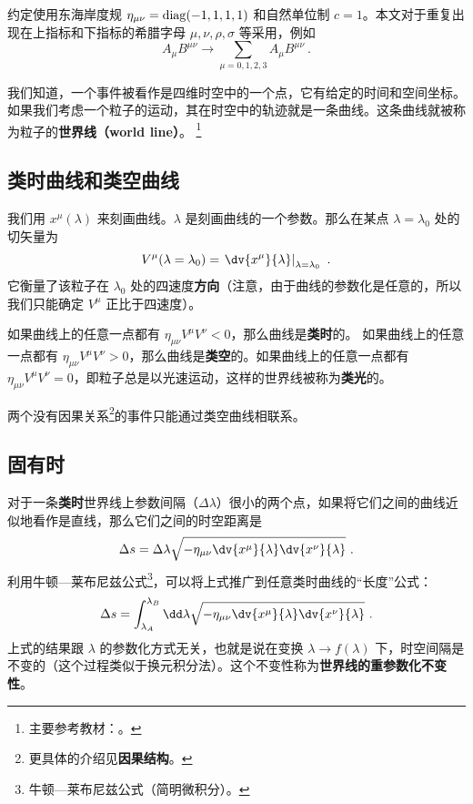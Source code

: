 

约定使用东海岸度规 $\eta_{\mu\nu}=\rm{diag}(-1,1,1,1)$ 和自然单位制 $c=1$。本文对于重复出现在上指标和下指标的希腊字母 $\mu,\nu,\rho,\sigma$ 等采用，例如
\begin{equation}
A_\mu B^{\mu\nu}\rightarrow \sum_{\mu=0,1,2,3}A_\mu B^{\mu\nu} ~.
\end{equation}


我们知道，一个事件被看作是四维时空中的一个点，它有给定的时间和空间坐标。如果我们考虑一个粒子的运动，其在时空中的轨迹就是一条曲线。这条曲线就被称为粒子的\textbf{世界线（world line）}。
\footnote{主要参考教材：\cite{陈斌广相}。}

\subsection{类时曲线和类空曲线}
我们用 $x^\mu(\lambda)$ 来刻画曲线。$\lambda$ 是刻画曲线的一个参数。那么在某点 $\lambda=\lambda_0$ 处的切矢量为
\begin{equation}
\begin{aligned}
V^\mu(\lambda=\lambda_0)=\left.\dv{x^\mu}{\lambda}\right|_{\lambda=\lambda_0}~.
\end{aligned}
\end{equation}
它衡量了该粒子在 $\lambda_0$ 处的四速度\textbf{方向}（注意，由于曲线的参数化是任意的，所以我们只能确定 $V^\mu$ 正比于四速度）。

如果曲线上的任意一点都有 $\eta_{\mu\nu}V^\mu V^\nu<0$，那么曲线是\textbf{类时}的。
如果曲线上的任意一点都有 $\eta_{\mu\nu}V^\mu V^\nu>0$，那么曲线是\textbf{类空}的。如果曲线上的任意一点都有 $\eta_{\mu\nu}V^\mu V^\nu=0$，即粒子总是以光速运动，这样的世界线被称为\textbf{类光}的。

两个没有因果关系\footnote{更具体的介绍见\textbf{因果结构}。}的事件只能通过类空曲线相联系。

\subsection{固有时}
对于一条\textbf{类时}世界线上参数间隔（$\Delta \lambda$）很小的两个点，如果将它们之间的曲线近似地看作是直线，那么它们之间的时空距离是
\begin{equation}
\Delta s=\Delta \lambda \sqrt{-\eta_{\mu\nu}\dv{x^\mu}{\lambda} \dv{x^\nu}{\lambda}}~.
\end{equation}
利用牛顿—莱布尼兹公式\footnote{牛顿—莱布尼兹公式（简明微积分）。}，可以将上式推广到任意类时曲线的“长度”公式：
\begin{equation}\label{eq_wdline_2}
\Delta s=\int_{\lambda_A}^{\lambda_B} \dd\lambda \sqrt{-\eta_{\mu\nu}\dv{x^\mu}{\lambda} \dv{x^\nu}{\lambda}}~.
\end{equation}
上式的结果跟 $\lambda$ 的参数化方式无关，也就是说在变换 $\lambda\rightarrow f(\lambda)$ 下，时空间隔是不变的（这个过程类似于换元积分法）。这个不变性称为\textbf{世界线的重参数化不变性}。

